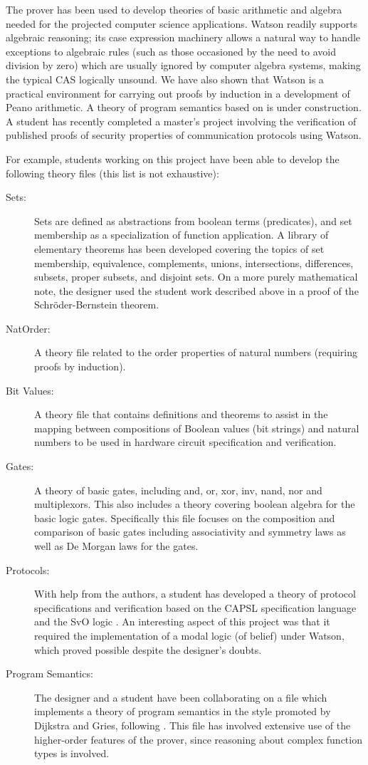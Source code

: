 \documentclass{kluwer}
\begin{document}
\begin{article}
The prover has been used to develop theories of basic arithmetic and
algebra needed for the projected computer science applications.
Watson readily supports algebraic reasoning; its case expression
machinery allows a natural way to handle exceptions to algebraic rules
(such as those occasioned by the need to avoid division by zero) which
are usually ignored by computer algebra systems, making the typical
CAS logically unsound.  We have also shown that Watson is a practical
environment for carrying out proofs by induction in a development of
Peano arithmetic. A theory of program semantics based on \cite{cohen}
is under construction.  A student has recently completed a master's
project involving the verification of published proofs of security
properties of communication protocols using Watson.

For example, students working on this project have been able to
develop the following theory files (this list is not exhaustive):

\begin{description}
\item[Sets:] Sets are defined as abstractions from boolean terms
(predicates), and set membership as a specialization of function
application. A library of elementary theorems has been developed
covering the topics of set membership, equivalence, complements,
unions, intersections, differences, subsets, proper subsets, and
disjoint sets.  On a more purely mathematical note, the designer used
the student work described above in a proof of the
Schr\"oder-Bernstein theorem.
\item[NatOrder:] A theory file related to the order properties of
natural numbers (requiring proofs by induction).
\item[Bit Values:] A theory file that contains definitions and
theorems to assist in the mapping between compositions of Boolean
values (bit strings) and natural numbers to be used in hardware
circuit specification and verification.
\item[Gates:] A theory of basic gates, including and, or, xor, inv,
nand, nor and multiplexors. This also includes a theory covering
boolean algebra for the basic logic gates. Specifically this file
focuses on the composition and comparison of basic gates including
associativity and symmetry laws as well as De Morgan laws for the
gates.
\item[Protocols:] With help from the authors, a student has developed
a theory of protocol specifications and verification based on the
CAPSL specification language \cite{capsl} and the SvO logic
\cite{svo}.  An interesting aspect of this project was that it
required the implementation of a modal logic (of belief) under Watson,
which proved possible despite the designer's doubts.
\item[Program Semantics:] The designer and a student have been
collaborating on a file which implements a theory of program semantics
in the style promoted by Dijkstra and Gries, following \cite{cohen}.
This file has involved extensive use of the higher-order features of
the prover, since reasoning about complex function types is involved.
\end{description}


\end{article}
\end{document}

